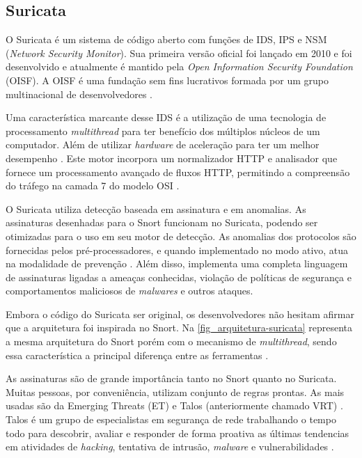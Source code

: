 \subsection{Suricata} \label{sec:suricata}

O Suricata é um sistema de código aberto com funções de IDS, IPS e NSM (\textit{Network Security Monitor}). Sua primeira versão oficial foi lançado em 2010 e foi desenvolvido e atualmente é mantido pela \textit{Open Information Security Foundation} (OISF). A OISF é uma fundação sem fins lucrativos formada por um grupo multinacional de desenvolvedores \cite{suricata}.

Uma característica marcante desse IDS é a utilização de uma tecnologia de processamento \textit{multithread} para ter benefício dos múltiplos núcleos de um computador. Além de utilizar \textit{hardware} de aceleração para ter um melhor desempenho \cite{arquitetura:martin}. Este motor incorpora um normalizador HTTP e analisador que fornece um processamento avançado de fluxos HTTP, permitindo a compreensão do tráfego na camada 7 do modelo OSI \cite{analise:cleber}.

O Suricata utiliza detecção baseada em assinatura e em anomalias. As assinaturas desenhadas para o Snort funcionam no Suricata, podendo ser otimizadas para o uso em seu motor de detecção. As anomalias dos protocolos são fornecidas pelos pré-processadores, e quando implementado no modo ativo, atua na modalidade de prevenção \cite{arquitetura:martin}. Além disso, implementa uma completa linguagem de assinaturas ligadas a ameaças conhecidas, violação de políticas de segurança e comportamentos maliciosos de \textit{malwares} e outros ataques.

Embora o código do Suricata ser original, os desenvolvedores não hesitam afirmar que a arquitetura foi inspirada no Snort. Na \autoref{fig_arquitetura-suricata} representa a mesma arquitetura do Snort porém com o mecanismo de \textit{multithread}, sendo essa característica a principal diferença entre as ferramentas \cite{arquitetura:martin}. 

As assinaturas são de grande importância tanto no Snort quanto no Suricata. Muitas pessoas, por conveniência, utilizam conjunto de regras prontas. As mais usadas são da Emerging Threats (ET) e Talos (anteriormente chamado VRT) \cite{suricata}. Talos é um grupo de especialistas em segurança de rede trabalhando o tempo todo para descobrir, avaliar e responder de forma proativa as últimas tendencias em atividades de \textit{hacking}, tentativa de intrusão, \textit{malware} e vulnerabilidades \cite{snort:talos}.

